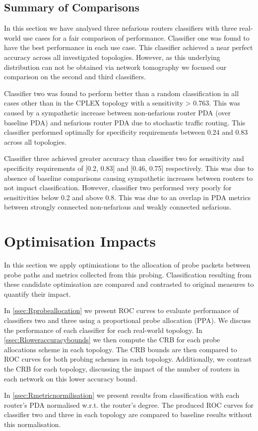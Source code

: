 \subsection{Summary of Comparisons}
\label{ssec:Rnefidsummary}
In this section we have analysed three nefarious routers classifiers with three real-world use cases for a fair comparison of performance. Classifier one was found to have the best performance in each use case. This classifier achieved a near perfect accuracy across all investigated topologies. However, as this underlying distribution can not be obtained via network tomography we focused our comparison on the second and third classifiers.\par
Classifier two was found to perform better than a random classification in all cases other than in the CPLEX topology with a sensitivity > 0.763. This was caused by a sympathetic increase between non-nefarious router PDA (over baseline PDA) and nefarious router PDA due to stochastic traffic routing. This classifier performed optimally for specificity requirements between 0.24 and 0.83 across all topologies.\par
Classifier three achieved greater accuracy than classifier two for sensitivity and specificity requirements of [0.2, 0.83] and [0.46, 0.75] respectively. This was due to absence of baseline comparisons causing sympathetic increases between routers to not impact classification. However, classifier two performed very poorly for sensitivities below 0.2 and above 0.8. This was due to an overlap in PDA metrics between strongly connected non-nefarious and weakly connected nefarious.

\section{Optimisation Impacts}
\label{sec:Rprobingoptimality}
In this section we apply optimisations to the allocation of probe packets between probe paths and metrics collected from this probing. Classification resulting from these candidate optimisation are compared and contrasted to original measures to quantify their impact.\par
In \cref{ssec:Rprobeallocation} we present ROC curves to evaluate performance of classifiers two and three using a proportional probe allocation (PPA). We discuss the performance of each classifier for each real-world topology. In \cref{ssec:Rloweraccuracybounds} we then compute the CRB for each probe allocations scheme in each topology. The CRB bounds are then compared to ROC curves for both probing schemes in each topology. Additionally, we contrast the CRB for each topology, discussing the impact of the number of routers in each network on this lower accuracy bound.\par
In \cref{ssec:Rmetricnormilisation} we present results from classification with each router's PDA normalised w.r.t. the router's degree. The produced ROC curves for classifier two and three in each topology are compared to baseline results without this normalisation.


